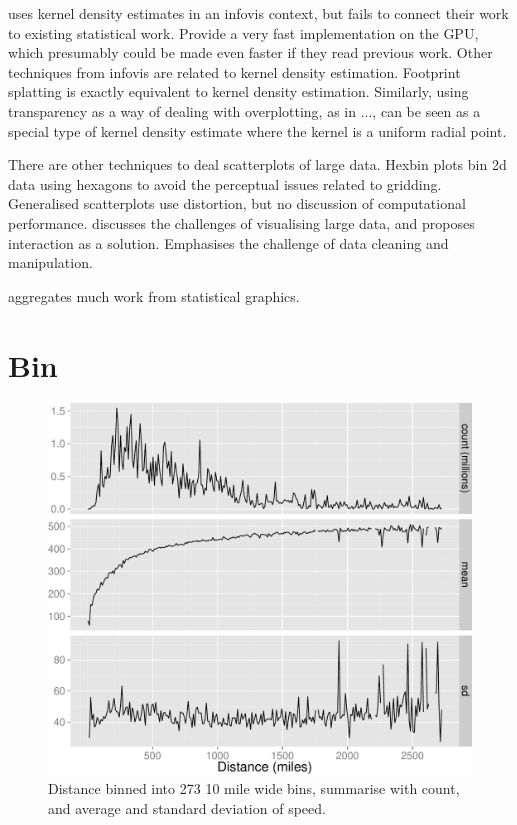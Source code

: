 \documentclass[journal]{vgtc}                %
\begin{document}
\citep{lampe:2011} uses kernel density estimates in an infovis context, but fails to connect their work to existing statistical work. Provide a very fast implementation on the GPU, which presumably could be made even faster if they read previous work. Other techniques from infovis are related to kernel density estimation. Footprint splatting \citep{becker:1997,yang:2003} is exactly equivalent to kernel density estimation. Similarly, using transparency as a way of dealing with overplotting, as in ..., can be seen as a special type of kernel density estimate where the kernel is a uniform radial point.

There are other techniques to deal scatterplots of large data. Hexbin plots \citep{carr:1987} bin 2d data using hexagons to avoid the perceptual issues related to gridding. Generalised scatterplots \citep{keim:2010} use distortion, but no discussion of computational performance. \citep{heer:2012} discusses the challenges of visualising large data, and proposes interaction as a solution. Emphasises the challenge of data cleaning and manipulation.

\citep{unwin:2006} aggregates much work from statistical graphics.

\section{Bin}
\label{sec:bin}


\begin{figure}[htb]
 \centering
 \includegraphics[width=\linewidth]{condense}
 \caption{Distance binned into 273 10 mile wide bins, summarise with count, and average and standard deviation of speed.}
 \label{fig:condense}
\end{figure}
\end{document}

